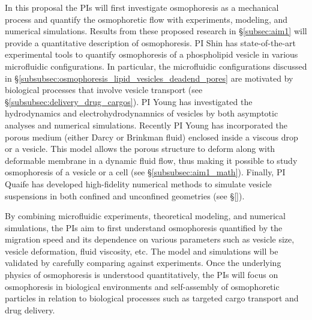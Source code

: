\documentclass[11pt]{article}
\begin{document}
In this proposal the PIs will first investigate osmophoresis as a
mechanical process and quantify the osmophoretic flow with experiments,
modeling, and numerical simulations.  Results from these proposed
research in \S\ref{subsec:aim1} will provide a quantitative description
of osmophoresis.  PI Shin has state-of-the-art experimental tools to
quantify osmophoresis of a phospholipid vesicle in various microfluidic
configurations.  In particular, the microfluidic configurations
discussed in \S\ref{subsubsec:osmophoresis_lipid_vesicles_deadend_pores}
are motivated by biological processes that involve vesicle transport
(see \S\ref{subsubsec:delivery_drug_cargos}).  PI Young has investigated
the hydrodynamics and electrohydrodynamnics of vesicles by both
asymptotic analyses and numerical simulations. Recently PI Young has
incorporated the porous medium (either Darcy or Brinkman fluid) enclosed
inside a viscous drop or a vesicle.  This model allows the porous
structure to deform along with deformable membrane in a dynamic fluid
flow, thus making it possible to study osmophoresis of a vesicle or a
cell (see \S\ref{subsubsec:aim1_math}).  Finally, PI Quaife has
developed high-fidelity numerical methods to simulate vesicle
suspensions in both confined and unconfined geometries (see \S\ref{}).

By combining microfluidic experiments, theoretical modeling, and
numerical simulations, the PIs aim to first understand osmophoresis
quantified by the migration speed and its dependence on various
parameters such as vesicle size, vesicle deformation, fluid viscosity,
etc. The model and simulations will be validated by carefully comparing
against experiments.  Once the underlying physics of osmophoresis is
understood quantitatively, the PIs will focus on osmophoresis in
biological environments and self-assembly of osmophoretic particles in
relation to biological processes such as targeted cargo transport and
drug delivery.

\end{document}
